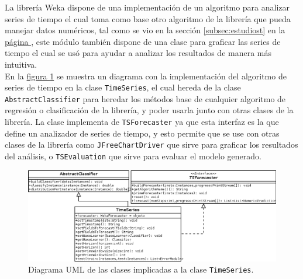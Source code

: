 La librería Weka dispone de una implementación de un algoritmo para analizar series de tiempo el cual toma como base otro algoritmo de la librería que pueda manejar datos numéricos, tal como se vio en la sección \ref{subsec:estudiost} en la \hyperref[subsec:estudiost]{página \pageref{subsec:estudiost}}, este módulo también dispone de una clase para graficar las series de tiempo el cual se usó para ayudar a analizar los resultados de manera más intuitiva.\\
En la \hyperref[fig:diagramaUml]{figura \ref{fig:diagramaUml}} 
se muestra un diagrama con la implementación del algoritmo de series de tiempo en la clase \texttt{TimeSeries}, el cual hereda de la clase \texttt{AbstractClassifier} para heredar los métodos base de cualquier algoritmo de regresión o clasificación de la librería, y poder usarla junto con otras clases de la librería. La clase implementa de \texttt{TSForecaster} ya que esta interfaz es la que define un analizador de series de tiempo, y esto permite que se use con otras clases de la librería como \texttt{JFreeChartDriver} que sirve para graficar los resultados del análisis, o \texttt{TSEvaluation} que sirve para evaluar el modelo generado.
\begin{figure}[!b]%
	\centering
	\includegraphics[width=15cm]{img/diagramaUml.png}
	\caption{Diagrama UML de las clases implicadas a la clase \texttt{TimeSeries}. }
	\label{fig:diagramaUml}
\end{figure}

